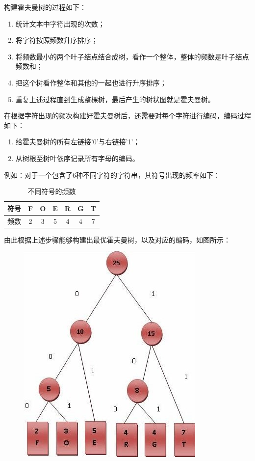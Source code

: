 构建霍夫曼树的过程如下：
\begin{enumerate}
    \item 统计文本中字符出现的次数；
    \item 将字符按照频数升序排序；
    \item 将频数最小的两个叶子结点结合成树，看作一个整体，整体的频数是叶子结点频数和；
    \item 把这个树看作整体和其他的一起也进行升序排序；
    \item 重复上述过程直到生成整棵树，最后产生的树状图就是霍夫曼树。
\end{enumerate}
在根据字符出现的频次构建好霍夫曼树后，还需要对每个字符进行编码，编码过程如下：
\begin{enumerate}
    \item 给霍夫曼树的所有左链接'0'与右链接'1'；
    \item 从树根至树叶依序记录所有字母的编码。
\end{enumerate}
例如：对于一个包含了6种不同字符的字符串，其符号出现的频率如下：
\begin{table}\centering
  \caption{不同符号的频数}
    \begin{tabular}[]{|c|c|c|c|c|c|c|}
      \hline
        符号 & F & O & E & R & G & T \\ \hline
        频数 & 2 & 3 & 5 & 4 & 4 & 7 \\ \hline
    \end{tabular}
\end{table}
由此根据上述步骤能够构建出最优霍夫曼树，以及对应的编码，如图所示：
\begin{figure}[h]\centering
    \includegraphics[width = 0.4\linewidth]{pages/jpeg/HuffmanCoding.jpg}
\end{figure}
